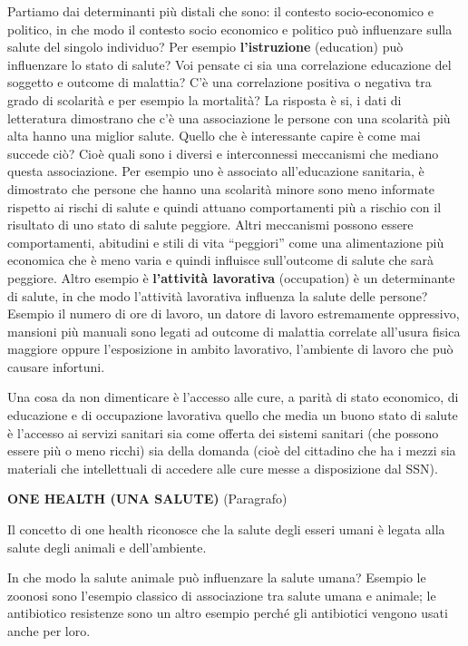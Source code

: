 \documentclass[]{article}
\begin{document}
Partiamo dai determinanti più distali che sono: il contesto
socio-economico e politico, in che modo il contesto socio economico e
politico può influenzare sulla salute del singolo individuo? Per esempio
\textbf{l'istruzione} (education) può influenzare lo stato di salute?
Voi pensate ci sia una correlazione educazione del soggetto e outcome di
malattia? C'è una correlazione positiva o negativa tra grado di
scolarità e per esempio la mortalità? La risposta è si, i dati di
letteratura dimostrano che c'è una associazione le persone con una
scolarità più alta hanno una miglior salute. Quello che è interessante
capire è come mai succede ciò? Cioè quali sono i diversi e interconnessi
meccanismi che mediano questa associazione. Per esempio uno è associato
all'educazione sanitaria, è dimostrato che persone che hanno una
scolarità minore sono meno informate rispetto ai rischi di salute e
quindi attuano comportamenti più a rischio con il risultato di uno stato
di salute peggiore. Altri meccanismi possono essere comportamenti,
abitudini e stili di vita ``peggiori'' come una alimentazione più
economica che è meno varia e quindi influisce sull'outcome di salute che
sarà peggiore. Altro esempio è \textbf{l'attività lavorativa}
(occupation) è un determinante di salute, in che modo l'attività
lavorativa influenza la salute delle persone? Esempio il numero di ore
di lavoro, un datore di lavoro estremamente oppressivo, mansioni più
manuali sono legati ad outcome di malattia correlate all'usura fisica
maggiore oppure l'esposizione in ambito lavorativo, l'ambiente di lavoro
che può causare infortuni.

Una cosa da non dimenticare è l'accesso alle cure, a parità di stato
economico, di educazione e di occupazione lavorativa quello che media un
buono stato di salute è l'accesso ai servizi sanitari sia come offerta
dei sistemi sanitari (che possono essere più o meno ricchi) sia della
domanda (cioè del cittadino che ha i mezzi sia materiali che
intellettuali di accedere alle cure messe a disposizione dal SSN).

\textbf{ONE HEALTH (UNA SALUTE)} (Paragrafo)

Il concetto di one health riconosce che la salute degli esseri umani è
legata alla salute degli animali e dell'ambiente.

In che modo la salute animale può influenzare la salute umana? Esempio
le zoonosi sono l'esempio classico di associazione tra salute umana e
animale; le antibiotico resistenze sono un altro esempio perché gli
antibiotici vengono usati anche per loro.
\end{document}
